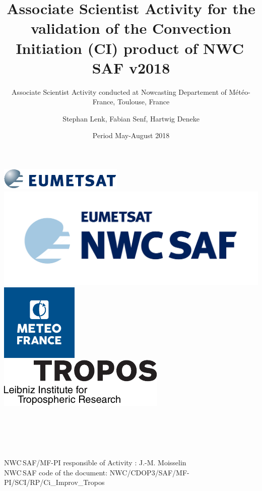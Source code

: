 \documentclass[a4paper,abstracton,DIV=classic,11pt]{scrreprt}
\title{Associate Scientist Activity for the validation of the Convection Initiation (CI) product of NWC\,SAF v2018}
\author{Stephan Lenk, Fabian Senf, Hartwig Deneke}
\subtitle{Associate Scientist Activity conducted at Nowcasting Departement of M\'{e}t\'{e}o-France, Toulouse, France}
\date{Period May-August 2018}
\begin{document}
\makeatletter
    \begin{titlepage}
        \begin{center}
        	\includegraphics[width=0.6\linewidth]{Grafiken/Logos/eumetsat_logo.pdf} \\
        	\includegraphics[width=0.6\linewidth]{Grafiken/Logos/nwcsaf_logo.pdf} \\[1ex]
            \includegraphics[width=0.25\linewidth]{Grafiken/Logos/LogoMeteoFrance.pdf}\\[2ex]
            \includegraphics[width=0.4\linewidth]{Grafiken/Logos/Schriftzug_en.pdf}\\[4ex]
            {\Large \bfseries \@author} \\[3ex]
            {\large \@subject} \\[3ex]
            {\huge \bfseries  \@title }\\[3ex] 
            {\large  \@subtitle}\\[1ex] 
            {\large \@date} \\ [2ex]
            {\large NWC\,SAF/MF-PI responsible of Activity : J.-M. Moisselin} \\ [2ex]
            {\large NWC\,SAF code of the document: NWC/CDOP3/SAF/MF-PI/SCI/RP/Ci\_Improv\_Tropos} \\ [1ex]
        \end{center}
    \end{titlepage}
\makeatother

\newpage
\setcounter{page}{1}


\tableofcontents








\end{document}
